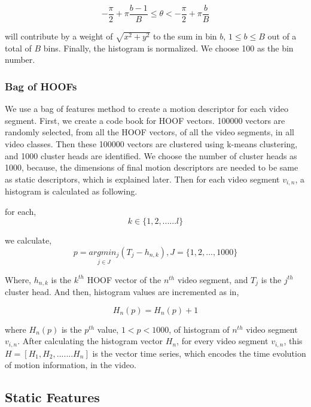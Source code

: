 \begin{equation}
- \frac{\pi}{2} + \pi\frac{b-1}{B} \leq \theta < -\frac{\pi}{2} + \pi\frac{b}{B}
\end{equation}

will contribute by a weight of $\sqrt{x^2 + y^2}$ to the sum in bin $b$, $1 \leq b \leq B$ out of a total of
$B$ bins. Finally, the histogram is normalized. We choose 100 as the bin number.

\subsubsection{Bag of HOOFs}
We use a bag of features method to create a motion descriptor for each video segment. First, we create a code book for HOOF vectors. 
100000 vectors are randomly selected, from all the HOOF vectors, of all the video segments, in all video classes. 
Then these 100000 vectors are clustered using k-means clustering, and 1000 cluster heads
are identified. We choose the number of cluster heads as 1000, because, the dimensions of final motion descriptors are needed to be same as
static descriptors, which is explained later. Then for each video segment $v_{i,n}$, a histogram is calculated as following. 

for each, 
\begin{equation}
k \in \big\{1,2,......l\big\}
\end{equation}

we calculate,
\begin{equation}
p = \underset{j\in J}{argmin_{j}}(T_{j}-h_{n,k}), J=\{1,2,...,1000\}
\end{equation}

Where, $h_{n,k}$ is the $k^{th}$ HOOF vector of the $n^{th}$ video segment, and $T_{j}$ is the $j^{th}$ cluster head. And then,
histogram values are incremented as in,

\begin{equation}
H_{n}(p) = H_{n}(p)+1
\end{equation}

where $H_{n}(p)$ is the $p^{th}$ value, $1<p<1000$, of histogram of $n^{th}$ video segment $v_{i,n}$. After calculating the histogram vector $H_{n}$, for every video segment $v_{i,n}$, 
this $H = [H_{1},H_{2},.......H_{n}]$ is the vector time series, which encodes the time evolution of motion information, in the video.

\subsection{Static Features}

